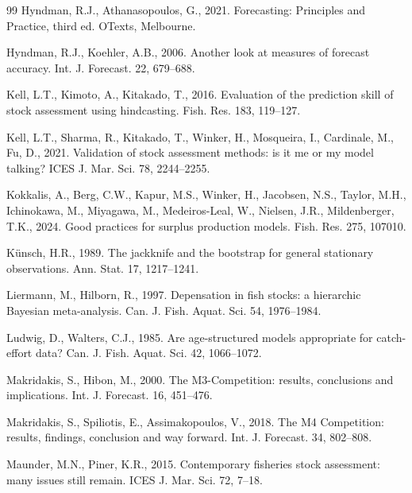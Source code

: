 \documentclass[preprint,11pt,authoryear]{elsarticle}
\theoremstyle{definition}
\theoremstyle{remark}
\begin{document}
\begin{thebibliography}{99}
Hyndman, R.J., Athanasopoulos, G., 2021. Forecasting: Principles and Practice, third ed. OTexts, Melbourne.

Hyndman, R.J., Koehler, A.B., 2006. Another look at measures of forecast accuracy. Int. J. Forecast. 22, 679--688.

Kell, L.T., Kimoto, A., Kitakado, T., 2016. Evaluation of the prediction skill of stock assessment using hindcasting. Fish. Res. 183, 119--127.

Kell, L.T., Sharma, R., Kitakado, T., Winker, H., Mosqueira, I., Cardinale, M., Fu, D., 2021. Validation of stock assessment methods: is it me or my model talking? ICES J. Mar. Sci. 78, 2244--2255.

Kokkalis, A., Berg, C.W., Kapur, M.S., Winker, H., Jacobsen, N.S., Taylor, M.H., Ichinokawa, M., Miyagawa, M., Medeiros-Leal, W., Nielsen, J.R., Mildenberger, T.K., 2024. Good practices for surplus production models. Fish. Res. 275, 107010.

K{\"u}nsch, H.R., 1989. The jackknife and the bootstrap for general stationary observations. Ann. Stat. 17, 1217--1241.

Liermann, M., Hilborn, R., 1997. Depensation in fish stocks: a hierarchic Bayesian meta-analysis. Can. J. Fish. Aquat. Sci. 54, 1976--1984.

Ludwig, D., Walters, C.J., 1985. Are age-structured models appropriate for catch-effort data? Can. J. Fish. Aquat. Sci. 42, 1066--1072.

Makridakis, S., Hibon, M., 2000. The M3-Competition: results, conclusions and implications. Int. J. Forecast. 16, 451--476.

Makridakis, S., Spiliotis, E., Assimakopoulos, V., 2018. The M4 Competition: results, findings, conclusion and way forward. Int. J. Forecast. 34, 802--808.

Maunder, M.N., Piner, K.R., 2015. Contemporary fisheries stock assessment: many issues still remain. ICES J. Mar. Sci. 72, 7--18.


\end{thebibliography}
\end{document}
